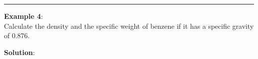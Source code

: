 \documentclass[10pt]{amsart}
\begin{document}
\par\vspace{2cm}

\rule{\textwidth}{0.02in}
\par
\begin{minipage}[t]{0.45\textwidth}
\raggedright
\textbf{Example 4}:\\
	Calculate the density and the specific weight of benzene if it has a specific gravity of 0.876.
\par\vspace{6cm}
\end{minipage}
\hfill
\begin{minipage}[t]{0.5\textwidth}
\textbf{Solution}:
\parb
\end{minipage}

\newpage
\end{document}
